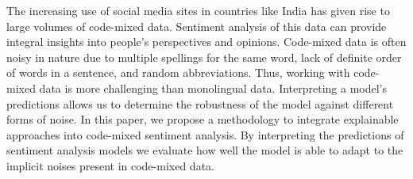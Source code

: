The increasing use of social media sites in countries like India has given rise to large volumes of code-mixed data. Sentiment analysis of this data can provide integral insights into people's perspectives and opinions. Code-mixed data is often noisy in nature due to multiple spellings for the same word, lack of definite order of words in a sentence, and random abbreviations. Thus, working with code-mixed data is more challenging than monolingual data. Interpreting a model's predictions allows us to determine the robustness of the model against different forms of noise.  In this paper, we propose a methodology to integrate explainable approaches into code-mixed sentiment analysis. By interpreting the predictions of sentiment analysis models we evaluate how well the model is able to adapt to the implicit noises present in code-mixed data.

